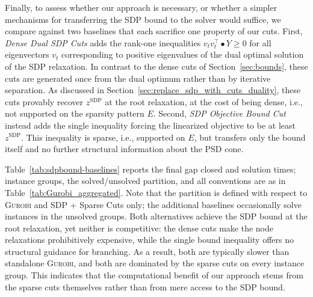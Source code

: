 \documentclass[twoside]{article}
\begin{document}
	Finally, to assess whether our approach is necessary, or whether a simpler mechanisms for transferring the SDP bound to the solver would suffice, we compare against two baselines that each sacrifice one property of our cuts.
	First, \emph{Dense Dual SDP Cuts} adds the rank-one inequalities
	$v_t v_t^{\top} \bullet Y \geq 0$ for all eigenvectors $v_t$ corresponding to
	positive eigenvalues of the dual optimal solution of the SDP relaxation. In
	contrast to the dense cuts of Section~\ref{sec:bounds}, these cuts are
	generated once from the dual optimum rather than by iterative separation. As
	discussed in Section~\ref{sec:replace_sdp_with_cuts_duality}, these cuts provably
	recover $z^{\text{SDP}}$ at the root relaxation, at the cost of being dense,
	i.e., not supported on the sparsity pattern $E$.
	Second, \emph{SDP Objective Bound Cut} instead adds the single inequality forcing the
	linearized objective to be at least $z^{\text{SDP}}$. This inequality is
	sparse, i.e., supported on $E$, but transfers only the bound itself and no
	further structural information about the PSD cone.
	
	
	
	Table~\ref{tab:sdpbound-baselines} reports the final gap closed and solution
	times; instance groups, the solved/unsolved partition, and all conventions are
	as in Table~\ref{tab:Gurobi_aggregated}. Note that the partition is
	defined with respect to \textsc{Gurobi} and SDP + Sparse Cuts only; the
	additional baselines occasionally solve instances in the unsolved groups.
	Both alternatives achieve the SDP bound at the root relaxation, yet neither
	is competitive: the dense cuts make the node relaxations prohibitively
	expensive, while the single bound inequality offers no structural guidance for
	branching. As a result, both are typically slower than standalone
	\textsc{Gurobi}, and both are dominated by the sparse cuts on every instance
	group. This indicates that the computational benefit of our approach stems
	from the sparse cuts themselves rather than from mere access to the SDP bound.
	
\end{document}
